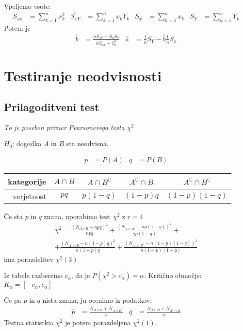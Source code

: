 \begin{multicols}{5}
Vpeljemo vsote:
{\small
\begin{align*}
    S_{xx} &= \sum_{k=1}^n x_k^2 &
    S_{xY} &= \sum_{k=1}^n x_k Y_k &
    S_{x} &= \sum_{k=1}^n x_k &
    S_{Y} &= \sum_{k=1}^n Y_k
\end{align*}}
Potem je
\begin{align*}
    \hat{b} &= \frac{n S_{xY} - S_x S_Y}{nS_{xx} - S_x^2} &
    \hat{a} &= \frac{1}{n} S_Y - \hat{b} \frac{1}{n} S_x
\end{align*}


\section{Testiranje neodvisnosti}
\subsection{Prilagoditveni test}
\textit{To je poseben primer Pearsonevega testa $\chi^2$}

$H_0$: dogodka $A$ in $B$ sta neodvisna.

\begin{align*}
    p &= P(A) &  q &= P(B)
\end{align*}
\begin{center}
    \begin{tabular}{r | c c c c}
        kategorije & $A \cap B$ & $A \cap B^\complement$ & $A^\complement \cap B$ & $A^\complement \cap B^\complement$ \\ \hline
        verjetnost & $pq$ & $p(1-q)$ & $(1-p)q$ & $(1-p)(1-q)$
    \end{tabular}
\end{center}

Če sta $p$ in $q$ znana, uporabimo test $\chi^2$ z $r = 4$
{\small
\begin{multline*}
    \chi^2 = \frac{(N_{A \cap B} - npq)^2}{npq} + \frac{(N_{A \cap B^\complement} - np(1-q))^2}{np(1-q)} + \\ + \frac{(N_{A^\complement \cap B} - n(1-p)q)^2}{n(1-p)q} + \frac{(N_{A^\complement \cap B^\complement} - n(1-p)(1-q))^2}{n(1-p)(1-q)}
\end{multline*}}
ima porazdelitev $\chi^2(3)$

Iz tabele razberemo $c_\alpha$, da je $P(\chi^2 > c_\alpha) = \alpha$. Kritično območje: $K_\alpha = [-c_\alpha, c_\alpha]$

Če pa $p$ in $q$ nista znana, ju ocenimo iz podatkov:
\begin{align*}
    \hat{p} &= \frac{N_{A\cap B} + N_{A \cap B^\complement}}{n} &
    \hat{q} &= \frac{N_{A\cap B} + N_{A^\complement \cap B}}{n}
\end{align*}
Testna statistkia $\chi^2$ je potem porazdeljena $\chi^2(1)$.


\end{multicols}
